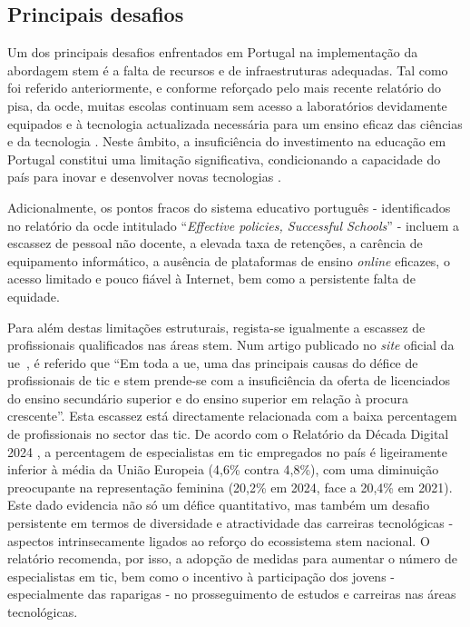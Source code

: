 \subsection{Principais desafios}
Um dos principais desafios enfrentados em Portugal na implementação da abordagem \acrshort{stem} é a falta de recursos e de infraestruturas adequadas. Tal como foi referido anteriormente, e conforme reforçado pelo mais recente relatório do \acrfull{pisa}, da \acrfull{ocde}, muitas escolas continuam sem acesso a laboratórios devidamente equipados e à tecnologia actualizada necessária para um ensino eficaz das ciências e da tecnologia \cite{pisa2022volume2}. Neste âmbito, a insuficiência do investimento na educação em Portugal constitui uma limitação significativa, condicionando a capacidade do país para inovar e desenvolver novas tecnologias \cite{Oquefalt37:online, Faltadei99:online, Odesinve56:online, EDUSTATP20:online, Portugal69:online}.

Adicionalmente, os pontos fracos do sistema educativo português - identificados no relatório da \acrshort{ocde} intitulado ``\textit{Effective policies, Successful Schools}'' \cite{pisa2018volumeV} - incluem a escassez de pessoal não docente, a elevada taxa de retenções, a carência de equipamento informático, a ausência de plataformas de ensino \textit{online} eficazes, o acesso limitado e pouco fiável à Internet, bem como a persistente falta de equidade.

Para além destas limitações estruturais, regista-se igualmente a escassez de profissionais qualificados nas áreas \acrshort{stem}. Num artigo publicado no \textit{site} oficial da \acrshort{ue}~\cite{cedefop}, é referido que ``Em toda a \acrshort{ue}, uma das principais causas do défice de profissionais de \acrshort{tic} e \acrshort{stem} prende-se com a insuficiência da oferta de licenciados do ensino secundário superior e do ensino superior em relação à procura crescente''. Esta escassez está directamente relacionada com a baixa percentagem de profissionais no sector das \acrshort{tic}. De acordo com o Relatório da Década Digital 2024 \cite{DigitalDecade2024}, a percentagem de especialistas em \acrshort{tic} empregados no país é ligeiramente inferior à média da União Europeia (4,6\% contra 4,8\%), com uma diminuição preocupante na representação feminina (20,2\% em 2024, face a 20,4\% em 2021). Este dado evidencia não só um défice quantitativo, mas também um desafio persistente em termos de diversidade e atractividade das carreiras tecnológicas - aspectos intrinsecamente ligados ao reforço do ecossistema \acrshort{stem} nacional. O relatório recomenda, por isso, a adopção de medidas para aumentar o número de especialistas em \acrshort{tic}, bem como o incentivo à participação dos jovens - especialmente das raparigas - no prosseguimento de estudos e carreiras nas áreas tecnológicas. %

